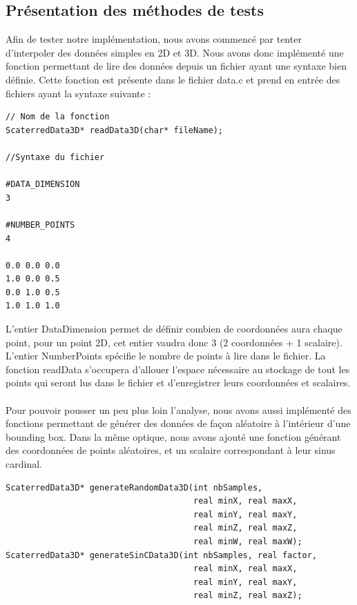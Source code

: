 \documentclass[a4paper,9pt]{article}
\begin{document}
\subsection{Présentation des méthodes de tests}
\label{subsec:presentation_tests}
Afin de tester notre implémentation, nous avons commencé par tenter d'interpoler des données simples en 2D et 3D. Nous avons donc implémenté une fonction permettant de lire des données depuis un fichier ayant une syntaxe bien définie. Cette fonction est présente dans le fichier data.c et prend en entrée des fichiers ayant la syntaxe suivante :
\begin{verbatim}
// Nom de la fonction
ScaterredData3D* readData3D(char* fileName);

//Syntaxe du fichier

#DATA_DIMENSION
3

#NUMBER_POINTS
4

0.0 0.0 0.0
1.0 0.0 0.5
0.0 1.0 0.5
1.0 1.0 1.0
\end{verbatim}
L'entier DataDimension permet de définir combien de coordonnées aura chaque point, pour un point 2D, cet entier vaudra donc 3 (2 coordonnées + 1 scalaire). L'entier NumberPoints spécifie le nombre de points à lire dans le fichier. La fonction readData s'occupera d'allouer l'espace nécessaire au stockage de tout les points qui seront lus dans le fichier et d'enregistrer leurs coordonnées et scalaires.\\\\
Pour pouvoir pousser un peu plus loin l'analyse, nous avons aussi implémenté des fonctions permettant de générer des données de façon aléatoire à l'intérieur d'une bounding box. Dans la même optique, nous avons ajouté une fonction générant des coordonnées de points aléatoires, et un scalaire correspondant à leur sinus cardinal.
\begin{verbatim}
ScaterredData3D* generateRandomData3D(int nbSamples,
                                      real minX, real maxX,
                                      real minY, real maxY,
                                      real minZ, real maxZ,
                                      real minW, real maxW);
ScaterredData3D* generateSinCData3D(int nbSamples, real factor,
                                      real minX, real maxX,
                                      real minY, real maxY,
                                      real minZ, real maxZ);
\end{verbatim} 
\end{document}
